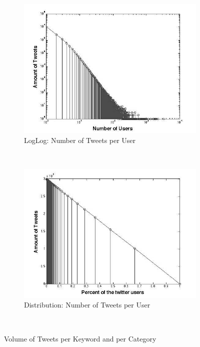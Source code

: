 \begin{figure}
        \centering
        \begin{subfigure}[b]{0.5\textwidth}
                \includegraphics[width=\textwidth]{img/anal/loglog_users_Tweets_1}
                \caption{LogLog: Number of Tweets per User}
                 \label{fig:u_log}
        \end{subfigure}%
        ~ %
        \begin{subfigure}[b]{0.5\textwidth}
                \includegraphics[width=\textwidth]{img/anal/no_power_1}
                \caption{Distribution: Number of Tweets per User}
                \label{fig:no_power}
        \end{subfigure}
        ~ %
      
        \caption{Volume of Tweets per Keyword and per Category}\label{fig:animals}
\end{figure}





